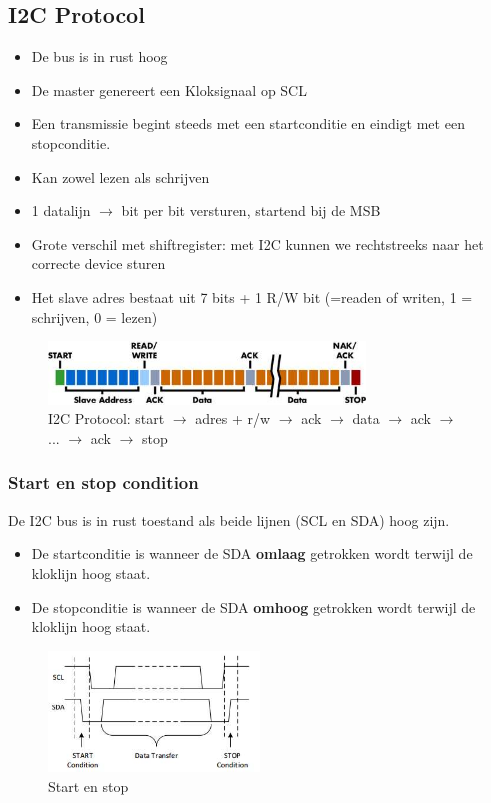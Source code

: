 \documentclass{article}
\newcommand{\bold}[1]{\textbf{#1}}
\begin{document}
\subsection{I2C Protocol}
\begin{itemize}
    \item De bus is in rust hoog
    \item De master genereert een Kloksignaal op SCL
    \item Een transmissie begint steeds met een startconditie en eindigt met een stopconditie.
    \item Kan zowel lezen als schrijven
    \item 1 datalijn $\rightarrow$ bit per bit versturen, startend bij de MSB
    \item Grote verschil met shiftregister: met I2C kunnen we rechtstreeks naar het correcte device sturen
    \item Het slave adres bestaat uit 7 bits + 1 R/W bit (=readen of writen, 1 = schrijven, 0 = lezen)
\end{itemize}

\begin{figure}[H]
    \centering
    \includegraphics[width=0.75\textwidth]{i2c-protocol.png}
    \caption{I2C Protocol: start $\rightarrow$ adres + r/w $\rightarrow$ ack $\rightarrow$ data $\rightarrow$ ack $\rightarrow$ ... $\rightarrow$ ack $\rightarrow$ stop}
\end{figure}

\subsubsection{Start en stop condition}
De I2C bus is in rust toestand als beide lijnen (SCL en SDA) hoog zijn.

\begin{itemize}
    \item De startconditie is wanneer de SDA \bold{omlaag} getrokken wordt terwijl de kloklijn hoog staat.
    \item De stopconditie is wanneer de SDA \bold{omhoog} getrokken wordt terwijl de kloklijn hoog staat.
\end{itemize}

\begin{figure}[H]
    \centering
    \includegraphics[width=0.5\textwidth]{i2c-start-stop.png}
    \caption{Start en stop}
\end{figure}
\end{document}
